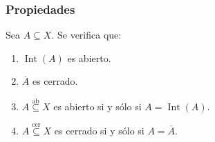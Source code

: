 \subsubsection{Propiedades}

Sea $A\subseteq X$. Se verifica que:
\begin{enumerate}[label=\arabic*)]
  \item $\operatorname{Int}(A)$ es abierto.
  \item $\overline{A}$ es cerrado.
  \item $A \overset{\text{ab}} \subseteq X$ es abierto si y sólo si
        $A=\operatorname{Int}(A)$.
  \item $A \overset{\text{cer}} \subseteq X$ es cerrado si y sólo si
        $A=\overline{A}$.
\end{enumerate}

